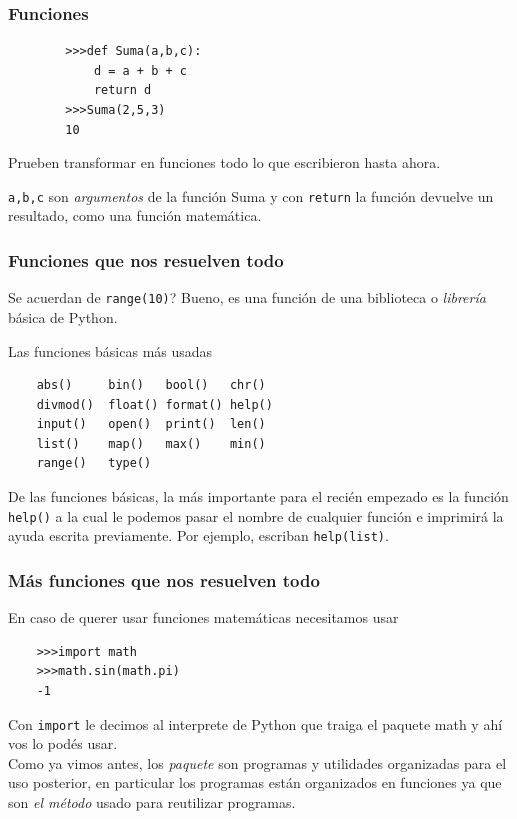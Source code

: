 \documentclass{beamer}
\begin{document}
\begin{frame}[fragile]
\frametitle{Funciones}
    \begin{verbatim}
        >>>def Suma(a,b,c):
            d = a + b + c
            return d
        >>>Suma(2,5,3)
        10
    \end{verbatim}
    Prueben transformar en funciones todo lo que escribieron hasta ahora.
    
    \texttt{a,b,c} son \emph{argumentos} de la función Suma y con \texttt{return} la función devuelve un resultado, como una función matemática.
\end{frame}


\begin{frame}[fragile]
    \frametitle{Funciones que nos resuelven todo}
    Se acuerdan de \texttt{range(10)}? Bueno, es una función de una biblioteca o \emph{librería} básica de Python.
    
    Las funciones básicas más usadas
    {\small
    \begin{center}
    \begin{verbatim}
    abs()     bin()   bool()   chr()   
    divmod()  float() format() help()  
    input()   open()  print()  len()
    list()    map()   max()    min()   
    range()   type()     
    \end{verbatim}
    \end{center}
    }
    De las funciones básicas, la más importante para el recién empezado es la función \texttt{help()} a la cual le podemos pasar el nombre de cualquier función e imprimirá la ayuda escrita previamente. Por ejemplo, escriban \texttt{help(list)}.

\end{frame}

\begin{frame}[fragile]
    \frametitle{Más funciones que nos resuelven todo}
    En caso de querer usar funciones matemáticas necesitamos usar
    \begin{verbatim}
    >>>import math
    >>>math.sin(math.pi)
    -1
    \end{verbatim}
    Con \texttt{import} le decimos al interprete de Python que traiga el paquete math y ahí vos lo podés usar.\\ Como ya vimos antes, los \emph{paquete} son programas y utilidades organizadas para el uso posterior, en particular los programas están organizados en funciones ya que son \emph{el método} usado para reutilizar programas.
\end{frame}
\end{document}
